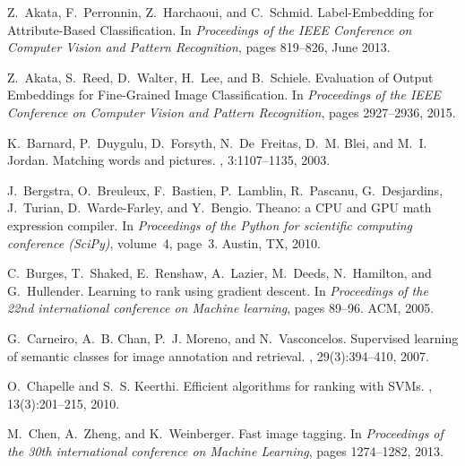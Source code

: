 \documentclass[10pt,twocolumn,letterpaper]{article}
\begin{document}
\begin{thebibliography}{10}\itemsep=-1pt

Z.~Akata, F.~Perronnin, Z.~Harchaoui, and C.~Schmid.
\newblock Label-{Embedding} for {Attribute}-{Based} {Classification}.
\newblock In {\em Proceedings of the {IEEE} {Conference} on {Computer} {Vision}
  and {Pattern} {Recognition}}, pages 819--826, June 2013.

Z.~Akata, S.~Reed, D.~Walter, H.~Lee, and B.~Schiele.
\newblock Evaluation of {Output} {Embeddings} for {Fine}-{Grained} {Image}
  {Classification}.
\newblock In {\em Proceedings of the {IEEE} {Conference} on {Computer} {Vision}
  and {Pattern} {Recognition}}, pages 2927--2936, 2015.

K.~Barnard, P.~Duygulu, D.~Forsyth, N.~De~Freitas, D.~M. Blei, and M.~I.
  Jordan.
\newblock Matching words and pictures.
, 3:1107--1135, 2003.

J.~Bergstra, O.~Breuleux, F.~Bastien, P.~Lamblin, R.~Pascanu, G.~Desjardins,
  J.~Turian, D.~Warde-Farley, and Y.~Bengio.
\newblock Theano: a {CPU} and {GPU} math expression compiler.
\newblock In {\em Proceedings of the {Python} for scientific computing
  conference ({SciPy})}, volume~4, page~3. Austin, TX, 2010.

C.~Burges, T.~Shaked, E.~Renshaw, A.~Lazier, M.~Deeds, N.~Hamilton, and
  G.~Hullender.
\newblock Learning to rank using gradient descent.
\newblock In {\em Proceedings of the 22nd international conference on {Machine}
  learning}, pages 89--96. ACM, 2005.

G.~Carneiro, A.~B. Chan, P.~J. Moreno, and N.~Vasconcelos.
\newblock Supervised learning of semantic classes for image annotation and
  retrieval.
, 29(3):394--410, 2007.

O.~Chapelle and S.~S. Keerthi.
\newblock Efficient algorithms for ranking with {SVMs}.
, 13(3):201--215, 2010.

M.~Chen, A.~Zheng, and K.~Weinberger.
\newblock Fast image tagging.
\newblock In {\em Proceedings of the 30th international conference on {Machine}
  {Learning}}, pages 1274--1282, 2013.


\end{thebibliography}
\end{document}
